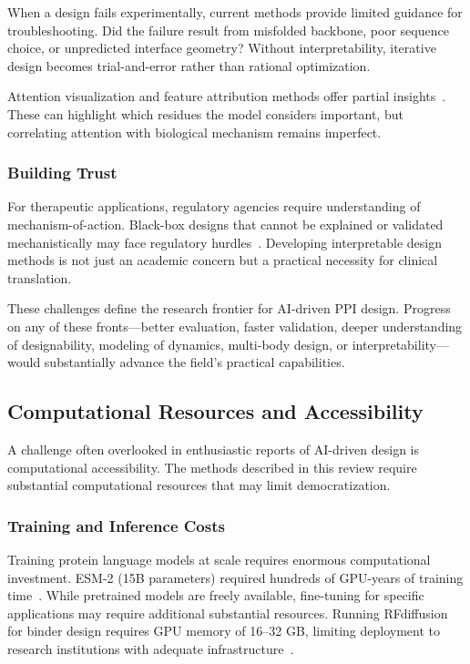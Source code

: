When a design fails experimentally, current methods provide limited guidance for troubleshooting. Did the failure result from misfolded backbone, poor sequence choice, or unpredicted interface geometry? Without interpretability, iterative design becomes trial-and-error rather than rational optimization.

Attention visualization and feature attribution methods offer partial insights~\cite{tubiana2022scanet}. These can highlight which residues the model considers important, but correlating attention with biological mechanism remains imperfect.

\subsubsection{Building Trust}

For therapeutic applications, regulatory agencies require understanding of mechanism-of-action. Black-box designs that cannot be explained or validated mechanistically may face regulatory hurdles~\cite{raybould2019developability}. Developing interpretable design methods is not just an academic concern but a practical necessity for clinical translation.

\vspace{1em}
\noindent
These challenges define the research frontier for AI-driven PPI design. Progress on any of these fronts---better evaluation, faster validation, deeper understanding of designability, modeling of dynamics, multi-body design, or interpretability---would substantially advance the field's practical capabilities.

\subsection{Computational Resources and Accessibility}
\label{subsec:computational}

A challenge often overlooked in enthusiastic reports of AI-driven design is computational accessibility. The methods described in this review require substantial computational resources that may limit democratization.

\subsubsection{Training and Inference Costs}

Training protein language models at scale requires enormous computational investment. ESM-2 (15B parameters) required hundreds of GPU-years of training time~\cite{lin2023esm2}. While pretrained models are freely available, fine-tuning for specific applications may require additional substantial resources. Running RFdiffusion for binder design requires GPU memory of 16--32 GB, limiting deployment to research institutions with adequate infrastructure~\cite{watson2023rfdiffusion}.

